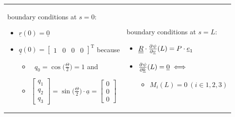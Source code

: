 \begin{frame}
  \vspace{0.5em}
  \begin{tabularx}{\linewidth}{XX}
    {
      boundary conditions at $s=0$:
      \begin{itemize}
        \item $\underline{r}(0) = \underline{0}$
        \item $\underline{q}(0) =
          \begin{bmatrix}
            1 & 0 & 0 & 0
          \end{bmatrix}^{\mathrm{T}}$ because
          \begin{itemize}
            \item $\: \: \, q_0 = \cos\bigl( \frac{\Theta}{2} \bigr) = 1$ and
            \item $\begin{bmatrix}
            q_1 \\ q_2 \\ q_3
          \end{bmatrix} = \sin \bigl( \frac{\Theta}{2} \bigr) \cdot \underline{a} =
          \begin{bmatrix}
            0 \\ 0 \\ 0
          \end{bmatrix}$
        \end{itemize}
      \end{itemize}
    } & {
      boundary conditions at $s=L$:
      \begin{itemize}
        \item $\doubleunderline{R} \cdot \pd{\psi}{\underline{v}}(L) = P \cdot \underline{e}_1$
        \item $\pd{\psi}{\underline{k}}(L) = \underline{0} \iff$
          \begin{itemize}
            \item $M_i(L) = 0 \: (i \in {1,2,3})$
          \end{itemize}
      \end{itemize}
    }
  \end{tabularx}
\end{frame}


